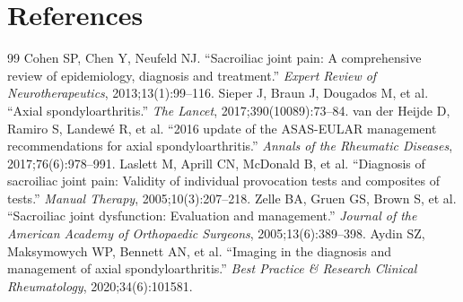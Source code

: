 \section*{References}
\begin{thebibliography}{99}
 Cohen SP, Chen Y, Neufeld NJ. ``Sacroiliac joint pain: A comprehensive review of epidemiology, diagnosis and treatment.'' \textit{Expert Review of Neurotherapeutics}, 2013;13(1):99--116.
 Sieper J, Braun J, Dougados M, et al. ``Axial spondyloarthritis.'' \textit{The Lancet}, 2017;390(10089):73--84.
 van der Heijde D, Ramiro S, Landew\'{e} R, et al. ``2016 update of the ASAS-EULAR management recommendations for axial spondyloarthritis.'' \textit{Annals of the Rheumatic Diseases}, 2017;76(6):978--991.
 Laslett M, Aprill CN, McDonald B, et al. ``Diagnosis of sacroiliac joint pain: Validity of individual provocation tests and composites of tests.'' \textit{Manual Therapy}, 2005;10(3):207--218.
 Zelle BA, Gruen GS, Brown S, et al. ``Sacroiliac joint dysfunction: Evaluation and management.'' \textit{Journal of the American Academy of Orthopaedic Surgeons}, 2005;13(6):389--398.
 Aydin SZ, Maksymowych WP, Bennett AN, et al. ``Imaging in the diagnosis and management of axial spondyloarthritis.'' \textit{Best Practice \& Research Clinical Rheumatology}, 2020;34(6):101581.
\end{thebibliography}

